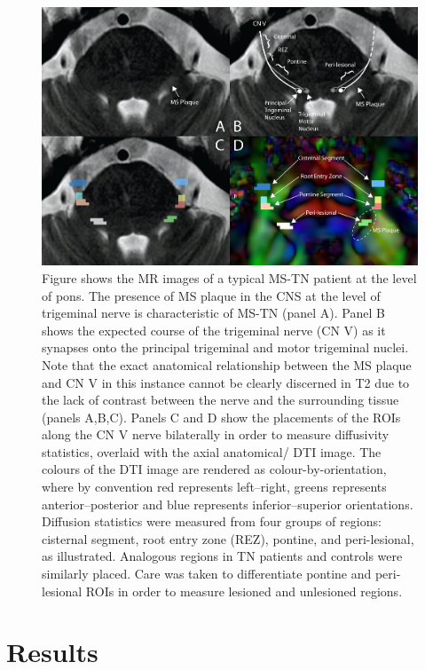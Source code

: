 \begin{figure}[p]
\includegraphics[width=\textwidth]{figure1.png}
\caption[Figure shows the MR images of a typical MS-TN patient at the level of pons.]{Figure shows the MR images of a typical MS-TN patient at the level of pons. The presence of MS plaque in the CNS at the level of trigeminal nerve is characteristic of MS-TN (panel A). Panel B shows the expected course of the trigeminal nerve (CN V) as it synapses onto the principal trigeminal and motor trigeminal nuclei. Note that the exact anatomical relationship between the MS plaque and CN V in this instance cannot be clearly discerned in T2 due to the lack of contrast between the nerve and the surrounding tissue (panels A,B,C). Panels C and D show the placements of the ROIs along the CN V nerve bilaterally in order to measure diffusivity statistics, overlaid with the axial anatomical/ DTI image. The colours of the DTI image are rendered as colour-by-orientation, where by convention red represents left–right, greens represents anterior–posterior and blue represents inferior–superior orientations. Diffusion statistics were measured from four groups of regions: cisternal segment, root entry zone (REZ), pontine, and peri-lesional, as illustrated. Analogous regions in TN patients and controls were similarly placed. Care was taken to differentiate pontine and peri- lesional ROIs in order to measure lesioned and unlesioned regions.}
\centering
\label{fig:MSfigure1}
\end{figure}


\section{Results}
